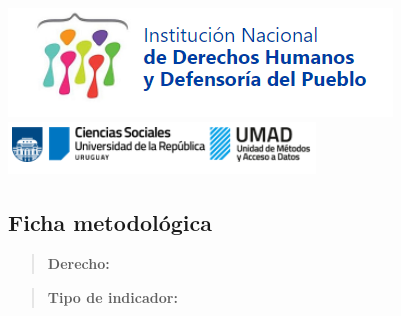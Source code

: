 \documentclass[
]{article}
\author{}
\date{}
\begin{document}
\href{https://www.gub.uy/institucion-nacional-derechos-humanos-uruguay/}{\includegraphics{LogoINDDHH.png}}
\href{https://umad.cienciassociales.edu.uy/}{\includegraphics{LogoFCS.png}}

\hypertarget{ficha-metodoluxf3gica}{%
\subsection{\texorpdfstring{\textbf{Ficha
metodológica}}{Ficha metodológica}}\label{ficha-metodoluxf3gica}}

\begin{quote}
\textbf{Derecho:}
\end{quote}

\begin{quote}
\textbf{Tipo de indicador:}
\end{quote}
\end{document}
